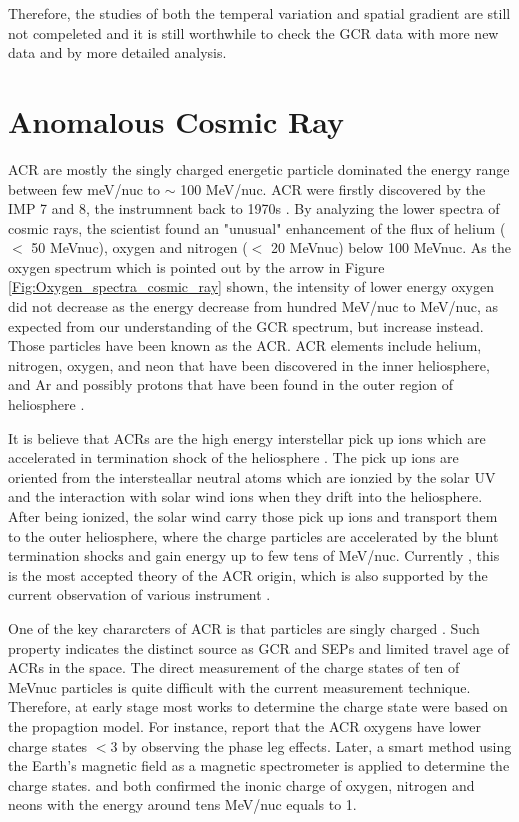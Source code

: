 Therefore, the studies of both the temperal variation and spatial gradient are still not compeleted and it is still worthwhile to check the GCR data with more new data and by more detailed analysis.


\section{Anomalous Cosmic Ray}

\ac{ACR} are mostly the singly charged energetic particle dominated the energy range between few meV/nuc to $\sim$ 100 MeV/nuc. \acs{ACR} were firstly discovered by the \acs{IMP} 7 and 8, the instrumnent back to 1970s \citet{Garcia1973ICRC, Hoverstadt1973PhRvL, McDonald1974ApJ}. By analyzing the lower spectra of cosmic rays, the scientist found an "unusual" enhancement of the flux of helium ($<$ 50 MeV\/nuc), oxygen and nitrogen ($<$ 20 MeV\/nuc) below 100 MeV\/nuc. As the oxygen spectrum which is pointed out by the arrow in Figure \ref{Fig:Oxygen_spectra_cosmic_ray} shown, the intensity of lower energy oxygen did not decrease as the energy decrease from hundred MeV/nuc to MeV/nuc, as expected from our understanding of the \ac{GCR} spectrum, but increase instead. Those particles have been known as the \ac{ACR}. \ac{ACR} elements include helium, nitrogen, oxygen, and neon that have been discovered in the inner heliosphere, and Ar and possibly protons that have been found in the outer region of heliosphere \citet{Klecker1995SSRv}.

It is believe that ACRs are the high energy interstellar pick up ions which are accelerated in termination shock of the heliosphere \citet{Fisk1974ApJ}. The pick up ions are oriented from the intersteallar neutral atoms which are ionzied by the solar UV and the interaction with solar wind ions when they drift into the heliosphere. After being ionized, the solar wind carry those pick up ions and transport them to the outer heliosphere, where the charge particles are accelerated by the blunt termination shocks \citet{McComas2006GeoRL} and gain energy up to few tens of MeV/nuc. Currently , this is the most accepted theory of the ACR origin, which is also supported by the current observation of various instrument \citet{McComas2019ApJ, Cummings2019ICRC}.

One of the key chararcters of \ac{ACR} is that particles are singly charged \citep{Klecker1980GeoRL,Adams1991ApJ, Klecker1995ApJ}. Such property indicates the distinct source as \ac{GCR} and \acp{SEP} and limited travel age of \acp{ACR} in the space. The direct measurement of the charge states of ten of MeV\/nuc particles is quite difficult with the current measurement technique. Therefore, at early stage most works to determine the charge state were based on the propagtion model. For instance, \citet{Klecker1980GeoRL} report that the \ac{ACR} oxygens have lower charge states $<$3 by observing the phase leg effects. Later, a smart method using the Earth's magnetic field as a magnetic spectrometer is applied to determine the charge states. \citet{Adams1991ApJ} and \citet{Klecker1995ApJ} both confirmed the inonic charge of oxygen, nitrogen and neons with the energy around tens MeV/nuc equals to 1.

